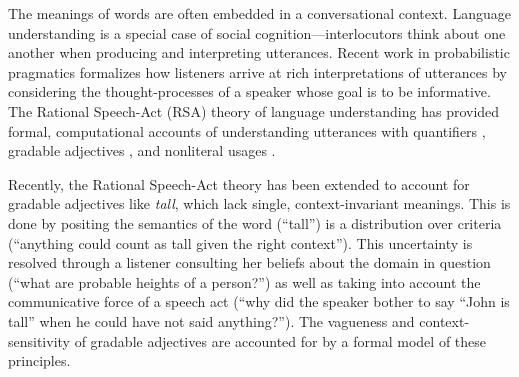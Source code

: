 \documentclass[10pt,letterpaper]{article}
\begin{document}
The meanings of words are often embedded in a conversational context.
Language understanding is a special case of social cognition---interlocutors think about one another when producing and interpreting utterances.  
Recent work in probabilistic pragmatics formalizes how listeners arrive at rich interpretations of utterances by considering the thought-processes of a speaker whose goal is to be informative.
The Rational Speech-Act (RSA) theory of language understanding \cite{Frank2012, Goodman2013} has provided formal, computational accounts of understanding utterances with quantifiers \cite{Goodman2013}, gradable adjectives \cite{Lassiter2015}, and nonliteral usages \cite{Kao2014}.






Recently, the Rational Speech-Act theory has been extended to account for gradable adjectives like \emph{tall}, which lack single, context-invariant meanings. 
This is done by positing the semantics of the word (``tall'') is a distribution over criteria (``anything could count as tall given the right context''). 
This uncertainty is resolved through a listener consulting her beliefs about the domain in question (``what are probable heights of a person?'') as well as taking into account the communicative force of a speech act (``why did the speaker bother to say ``John is tall'' when he could have not said anything?'').
The vagueness and context-sensitivity of gradable adjectives are accounted for by a formal model of these principles.
\end{document}
